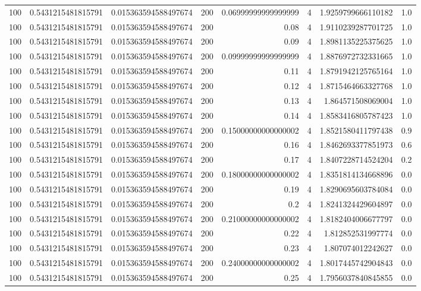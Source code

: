 \documentclass[11pt]{article}
\begin{document}
\begin{center}
\begin{tabular}{rrrrrrrr}
100 & 0.5431215481815791 & 0.015363594588497674 & 200 & 0.06999999999999999 & 4 & 1.9259799666110182 & 1.0\\
100 & 0.5431215481815791 & 0.015363594588497674 & 200 & 0.08 & 4 & 1.9110239287701725 & 1.0\\
100 & 0.5431215481815791 & 0.015363594588497674 & 200 & 0.09 & 4 & 1.8981135225375625 & 1.0\\
100 & 0.5431215481815791 & 0.015363594588497674 & 200 & 0.09999999999999999 & 4 & 1.8876972732331665 & 1.0\\
100 & 0.5431215481815791 & 0.015363594588497674 & 200 & 0.11 & 4 & 1.8791942125765164 & 1.0\\
100 & 0.5431215481815791 & 0.015363594588497674 & 200 & 0.12 & 4 & 1.8715464663327768 & 1.0\\
100 & 0.5431215481815791 & 0.015363594588497674 & 200 & 0.13 & 4 & 1.864571508069004 & 1.0\\
100 & 0.5431215481815791 & 0.015363594588497674 & 200 & 0.14 & 4 & 1.8583416805787423 & 1.0\\
100 & 0.5431215481815791 & 0.015363594588497674 & 200 & 0.15000000000000002 & 4 & 1.8521580411797438 & 0.9\\
100 & 0.5431215481815791 & 0.015363594588497674 & 200 & 0.16 & 4 & 1.8462693377851973 & 0.6\\
100 & 0.5431215481815791 & 0.015363594588497674 & 200 & 0.17 & 4 & 1.8407228714524204 & 0.2\\
100 & 0.5431215481815791 & 0.015363594588497674 & 200 & 0.18000000000000002 & 4 & 1.8351814134668896 & 0.0\\
100 & 0.5431215481815791 & 0.015363594588497674 & 200 & 0.19 & 4 & 1.8290695603784084 & 0.0\\
100 & 0.5431215481815791 & 0.015363594588497674 & 200 & 0.2 & 4 & 1.8241324429604897 & 0.0\\
100 & 0.5431215481815791 & 0.015363594588497674 & 200 & 0.21000000000000002 & 4 & 1.8182404006677797 & 0.0\\
100 & 0.5431215481815791 & 0.015363594588497674 & 200 & 0.22 & 4 & 1.812852531997774 & 0.0\\
100 & 0.5431215481815791 & 0.015363594588497674 & 200 & 0.23 & 4 & 1.807074012242627 & 0.0\\
100 & 0.5431215481815791 & 0.015363594588497674 & 200 & 0.24000000000000002 & 4 & 1.8017445742904843 & 0.0\\
100 & 0.5431215481815791 & 0.015363594588497674 & 200 & 0.25 & 4 & 1.7956037840845855 & 0.0\\

\end{tabular}
\end{center}
\end{document}
